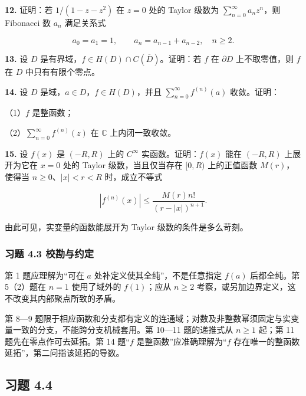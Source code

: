 \documentclass[11pt,a4paper]{article}
\begin{document}
\par{}
\noindent\textbf{12.} 证明：若 \(1/(1-z-z^2)\) 在 \(z=0\) 处的 Taylor 级数为
\(\sum_{n=0}^{\infty}a_nz^n\)，则 Fibonacci 数 \(a_n\) 满足关系式

\[
a_0=a_1=1,\qquad a_n=a_{n-1}+a_{n-2},\quad n\ge2.
\]

\par{}
\noindent\textbf{13.} 设 \(D\)
是有界域，\(f\in H(D)\cap C(\overline D)\)。证明：若 \(f\) 在
\(\partial D\) 上不取零值，则 \(f\) 在 \(D\) 中只有有限个零点。

\par{}
\noindent\textbf{14.} 设 \(D\) 是域，\(a\in D\)，\(f\in H(D)\)，并且
\(\sum_{n=0}^{\infty}f^{(n)}(a)\) 收敛。证明：

（1）\(f\) 是整函数；

（2）\(\sum_{n=0}^{\infty}f^{(n)}(z)\) 在 \(\mathbb C\) 上内闭一致收敛。

\par{}
\noindent\textbf{15.} 设 \(f(x)\) 是 \((-R,R)\) 上的 \(C^\infty\)
实函数。证明：\(f(x)\) 能在 \((-R,R)\) 上展开为它在 \(x=0\) 处的 Taylor
级数，当且仅当存在 \([0,R)\) 上的正值函数 \(M(r)\)，使得当
\(n\ge0\)、\(|x|<r<R\) 时，成立不等式

\[
|f^{(n)}(x)|\le\frac{M(r)n!}{(r-|x|)^{n+1}}.
\]

由此可见，实变量的函数能展开为 Taylor 级数的条件是多么苛刻。

\subsubsection{习题 4.3
校勘与约定}\label{ch04-practice-ux4e60ux9898-43-ux6821ux52d8ux4e0eux7ea6ux5b9a}

第 1 题应理解为``可在 \(a\) 处补定义使其全纯''，不是任意指定 \(f(a)\)
后都全纯。第 5（2）题在 \(n=1\) 使用了域外的 \(f(1)\)；应从 \(n\ge2\)
考察，或另加边界定义，这不改变其内部聚点所致的矛盾。

第 8---9
题限于相应函数和分支都有定义的连通域；对数及非整数幂须固定与实变量一致的分支，不能跨分支机械套用。第
10---11 题的递推式从 \(n\ge1\) 起；第 11 题先在零点作可去延拓。第 14
题``\(f\) 是整函数''应准确理解为``\(f\)
存在唯一的整函数延拓''，第二问指该延拓的导数。

\subsection{习题 4.4}\label{ch04-practice-heading-4}
\end{document}
